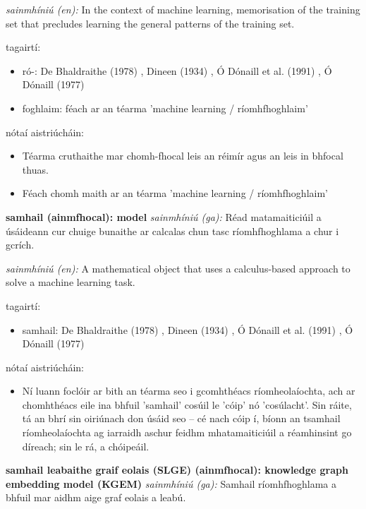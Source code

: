 \documentclass{article}
\begin{document}
\textit{sainmhíniú (en):} In the context of machine learning, memorisation of the training set that precludes learning the general patterns of the training set.

tagairtí:
\begin{itemize}
	\item ró-: De Bhaldraithe (1978) \cite{de-bhaldraithe}, Dineen (1934) \cite{dineen}, Ó Dónaill et al. (1991) \cite{focloir-beag}, Ó Dónaill (1977) \cite{odonaill}
	\item foghlaim: féach ar an téarma 'machine learning / ríomhfhoghlaim'
\end{itemize}

nótaí aistriúcháin:
\begin{itemize}
	\item Téarma cruthaithe mar chomh-fhocal leis an réimír agus an leis in bhfocal thuas.
	\item Féach chomh maith ar an téarma 'machine learning / ríomhfhoghlaim'
\end{itemize}


\textbf{samhail (ainmfhocal): model}
\textit{sainmhíniú (ga):} Réad matamaiticiúil a úsáideann cur chuige bunaithe ar calcalas chun tasc ríomhfhoghlama a chur i gcrích.

\textit{sainmhíniú (en):} A mathematical object that uses a calculus-based approach to solve a machine learning task.

tagairtí:
\begin{itemize}
	\item samhail: De Bhaldraithe (1978) \cite{de-bhaldraithe}, Dineen (1934) \cite{dineen}, Ó Dónaill et al. (1991) \cite{focloir-beag}, Ó Dónaill (1977) \cite{odonaill}
\end{itemize}

nótaí aistriúcháin:
\begin{itemize}
	\item Ní luann foclóir ar bith an téarma seo i gcomhthéacs ríomheolaíochta, ach ar chomhthéacs eile ina bhfuil 'samhail' cosúil le 'cóip' nó 'cosúlacht'. Sin ráite, tá an bhrí sin oiriúnach don úsáid seo -- cé nach cóip í, bíonn an tsamhail ríomheolaíochta ag iarraidh aschur feidhm mhatamaiticiúil a réamhinsint go díreach; sin le rá, a chóipeáil.
\end{itemize}


\textbf{samhail leabaithe graif eolais (SLGE) (ainmfhocal): knowledge graph embedding model (KGEM)}
\textit{sainmhíniú (ga):} Samhail ríomhfhoghlama a bhfuil mar aidhm aige graf eolais a leabú.
\end{document}
